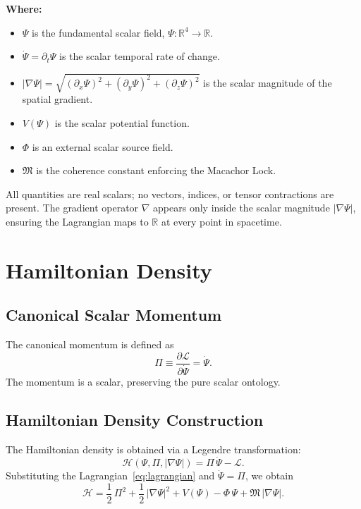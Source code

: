 \documentclass[11pt,a4paper]{article}
\theoremstyle{definition}
\theoremstyle{plain}
\newcommand{\M}{\mathfrak{M}}
\newcommand{\Lag}{\mathcal{L}}
\newcommand{\Ham}{\mathcal{H}}
\begin{document}
\noindent
\textbf{Where:}
\begin{itemize}[leftmargin=2em]
    \item $\Psi$ is the fundamental scalar field, $\Psi : \mathbb{R}^{4} \to \mathbb{R}$.
    \item $\dot{\Psi} = \partial_{t}\Psi$ is the scalar temporal rate of change.
    \item $|\nabla\Psi| = \sqrt{(\partial_{x}\Psi)^{2} + (\partial_{y}\Psi)^{2} + (\partial_{z}\Psi)^{2}}$ is the scalar magnitude of the spatial gradient.
    \item $V(\Psi)$ is the scalar potential function.
    \item $\Phi$ is an external scalar source field.
    \item $\M$ is the coherence constant enforcing the Macachor Lock.
\end{itemize}

All quantities are real scalars; no vectors, indices, or tensor contractions are present. The gradient operator $\nabla$ appears only inside the scalar magnitude $|\nabla\Psi|$, ensuring the Lagrangian maps to $\mathbb{R}$ at every point in spacetime.

\section{Hamiltonian Density}\label{sec:hamiltonian}

\subsection{Canonical Scalar Momentum}

The canonical momentum is defined as
\begin{equation}\label{eq:momentum}
\Pi \equiv \frac{\partial \Lag}{\partial \dot{\Psi}} = \dot{\Psi}.
\end{equation}
The momentum is a scalar, preserving the pure scalar ontology.

\subsection{Hamiltonian Density Construction}

The Hamiltonian density is obtained via a Legendre transformation:
\begin{equation}
\Ham(\Psi, \Pi, |\nabla\Psi|) = \Pi\,\dot{\Psi} - \Lag.
\end{equation}
Substituting the Lagrangian~\eqref{eq:lagrangian} and $\dot{\Psi} = \Pi$, we obtain
\begin{equation}\label{eq:hamiltonian}
\Ham
=
\frac{1}{2}\,\Pi^{2}
+
\frac{1}{2}\,|\nabla\Psi|^{2}
+
V(\Psi)
-
\Phi\,\Psi
+
\M\,|\nabla\Psi|.
\end{equation}
\end{document}
